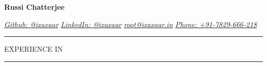 \documentclass[10pt]{article} %
\begin{document}
\begin{center}
\Huge\textbf{Russi Chatterjee}
\end{center}

\noindent\href{https://github.com/ixaxaar}{\textit{\textcolor{RoyalPurple}{Github: @ixaxaar}}} \hspace{20pt} \href{http://in.linkedin.com/in/ixaxaar/}{\textit{\textcolor{RoyalPurple}{LinkedIn: @ixaxaar}}} \hspace{20pt}
\href{mailto:russichatterjee@gmail.com}{\textit{\textcolor{RoyalPurple}{root@ixaxaar.in}}} \hspace{20pt} \href{tel:917829666218}{\textit{\textcolor{RoyalPurple}{Phone: +91-7829-666-218}}}
\newline
\newline


\noindent\textcolor{Apricot}{\rule{17cm}{1.8pt}}

\newline

\noindent\large{EXPERIENCE IN}

\noindent\textcolor{Apricot}{\rule{17cm}{1.8pt}}
\end{document}
